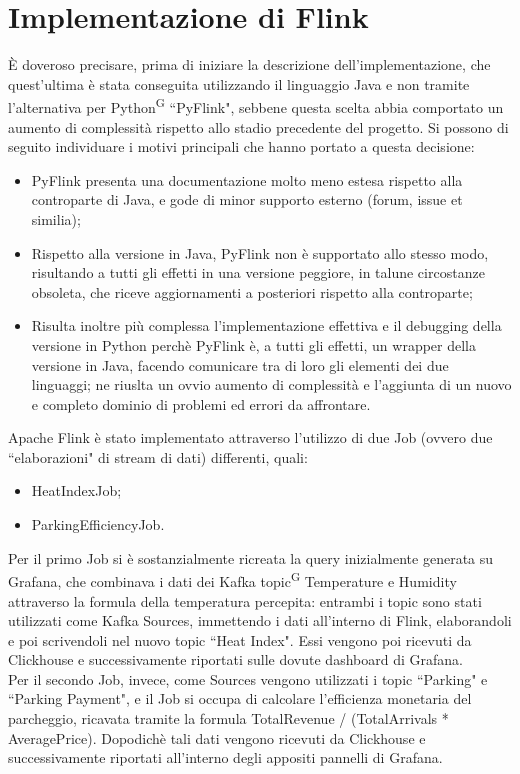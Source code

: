 \documentclass[8pt]{article}
\newcommand{\glossterm}[1]{#1\textsuperscript{G}} %
\begin{document}
\section{Implementazione di Flink} \label{sec:impl}
È doveroso precisare, prima di iniziare la descrizione dell'implementazione, che quest'ultima è stata conseguita utilizzando il linguaggio Java e non tramite l'alternativa
per \glossterm{Python} ``PyFlink", sebbene questa scelta abbia comportato un aumento di complessità rispetto allo stadio precedente del progetto. Si possono di seguito individuare i motivi principali che hanno portato a questa decisione:
\begin{itemize}
\setlength\itemsep{0em}
	\item PyFlink presenta una documentazione molto meno estesa rispetto alla controparte di Java, e gode di minor supporto esterno (forum, issue et similia); 
	\item Rispetto alla versione in Java, PyFlink non è supportato allo stesso modo, risultando a tutti gli effetti in una versione peggiore, in talune circostanze obsoleta, che riceve aggiornamenti a posteriori rispetto alla controparte;
	\item Risulta inoltre più complessa l'implementazione effettiva e il debugging della versione in Python perchè PyFlink è, a tutti gli effetti, un wrapper della versione in Java, facendo comunicare tra di loro gli elementi dei due linguaggi; ne riuslta un ovvio aumento di complessità e l'aggiunta di un nuovo e completo dominio di problemi ed errori da affrontare.  
\end{itemize}
Apache Flink è stato implementato attraverso l'utilizzo di due Job (ovvero due ``elaborazioni" di stream di dati) differenti, quali:
\begin{itemize}
\setlength\itemsep{0em}
	\item HeatIndexJob;
	\item ParkingEfficiencyJob.
\end{itemize}
Per il primo Job si è sostanzialmente ricreata la query inizialmente generata su Grafana, che combinava i dati dei Kafka \glossterm{topic} Temperature e Humidity attraverso 
la formula della temperatura percepita: entrambi i topic sono stati utilizzati come Kafka Sources, immettendo i dati all'interno di Flink, elaborandoli e poi scrivendoli 
nel nuovo topic ``Heat Index". Essi vengono poi ricevuti da Clickhouse e successivamente riportati sulle dovute dashboard di Grafana. \\
Per il secondo Job, invece, come Sources vengono utilizzati i topic ``Parking" e ``Parking Payment", e il Job si occupa di calcolare l'efficienza monetaria del parcheggio, ricavata tramite 
la formula Total\textunderscore Revenue / (Total\textunderscore Arrivals * Average\textunderscore Price). Dopodichè tali dati vengono ricevuti da Clickhouse e successivamente riportati all'interno degli appositi pannelli di Grafana. 
\end{document}
